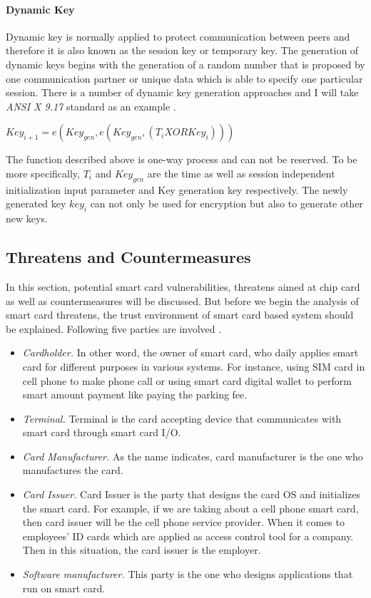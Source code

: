 \paragraph{Dynamic Key}
Dynamic key is normally applied to protect communication between peers and therefore it is also known as the session key or temporary key. The generation of dynamic keys begins with the generation of a random number that is proposed by one communication partner or unique data which is able to specify one particular session. There is a number of dynamic key generation approaches and I will take \emph{ANSI X 9.17} standard as an example \cite{handbook}. 
\begin{center}
$Key_{i+1} = e(Key_{gen},e(Key_{gen},(T_{i} XOR Key_{i})))$
\end{center}
The function described above is one-way process and can not be reserved. To be more specifically, $T_{i}$ and  $Key_{gen}$ are the time as well as session independent initialization input parameter and Key generation key respectively. The newly generated  key $key_{i}$ can not only be used for encryption but also to generate other new keys.
\subsection{Threatens and Countermeasures}
In this section, potential smart card vulnerabilities, threatens aimed at chip card as well as countermeasures will be discussed. But before we begin the analysis of smart card threatens, the trust environment of smart card based system should be explained. Following five parties are involved \cite{smart_card_attack1}.
\begin{itemize}
\item \emph{Cardholder.} In other word, the owner of smart card, who daily applies smart card for different purposes in various systems. For instance, using SIM card in cell phone to make phone call or using smart card digital wallet to perform smart amount payment like paying the parking fee.
\item \emph{Terminal.} Terminal is the card accepting device that communicates with smart card through smart card I/O.
\item \emph{Card Manufacturer.} As the name indicates, card manufacturer is the one who manufactures  the card.
\item \emph{Card Issuer.} Card Issuer is the party that designs the card OS and initializes the smart card. For example, if we are taking about a cell phone smart card, then card issuer will be the cell phone service provider. When it comes to employees' ID cards which are applied as access control tool for a company. Then in this situation, the card issuer is the employer.
\item \emph{Software manufacturer.} This party is the one who designs applications that run on smart card.
\end{itemize}
